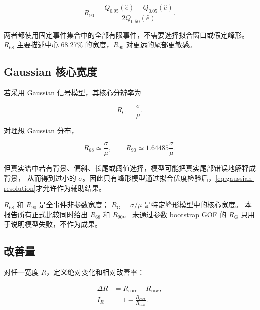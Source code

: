 \documentclass[UTF8,12pt,a4paper,oneside,fontset=none]{ctexart}
\numberwithin{equation}{section}
\newcommand{\Rsixtyeight}{R_{68}}
\newcommand{\Rninety}{R_{90}}
\newcommand{\Erel}{\hat e}
\begin{document}
\begin{equation}
\Rninety
=
\frac{Q_{0.95}(\Erel)-Q_{0.05}(\Erel)}{2Q_{0.50}(\Erel)}.
\label{eq:r90}
\end{equation}

两者都使用固定事件集合中的全部有限事件，不需要选择拟合窗口或假定峰形。
\(\Rsixtyeight\) 主要描述中心 68.27\% 的宽度，\(\Rninety\) 对更远的尾部更敏感。

\subsection{Gaussian 核心宽度}

若采用 Gaussian 信号模型，其核心分辨率为

\begin{equation}
R_{\mathrm G}=\frac{\sigma}{\mu}.
\label{eq:gaussian-resolution}
\end{equation}

对理想 Gaussian 分布，

\begin{equation}
\Rsixtyeight\simeq\frac{\sigma}{\mu},
\qquad
\Rninety\simeq1.64485\frac{\sigma}{\mu}.
\label{eq:gaussian-equivalence}
\end{equation}

但真实谱中若有背景、偏斜、长尾或阈值选择，模型可能把真实尾部错误地解释成背景，
从而得到过小的 \(\sigma\)。因此只有峰形模型通过拟合优度检验后，\cref{eq:gaussian-resolution}才允许作为辅助结果。

\begin{warningbox}[title={三个指标不能混用}]
\(\Rsixtyeight\) 和 \(\Rninety\) 是全事件非参数宽度；
\(R_{\mathrm G}=\sigma/\mu\) 是特定峰形模型中的核心宽度。
本报告所有正式比较同时给出 \(\Rsixtyeight\) 和 \(\Rninety\)。
未通过参数 bootstrap GOF 的 \(R_{\mathrm G}\) 只用于说明模型失败，不作为成果。
\end{warningbox}

\subsection{改善量}

对任一宽度 \(R\)，定义绝对变化和相对改善率：

\begin{align}
\Delta R
&=
R_{\mathrm{corr}}-R_{\mathrm{raw}},
\label{eq:delta-r}\\
I_R
&=
1-\frac{R_{\mathrm{corr}}}{R_{\mathrm{raw}}}.
\label{eq:relative-improvement}
\end{align}
\end{document}
